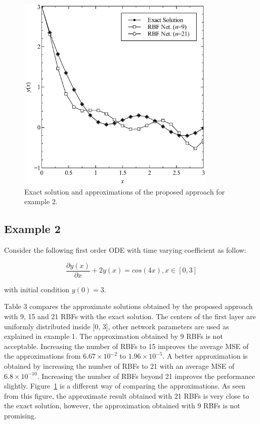 \begin{figure}
\includegraphics[width=9.5cm]{Fig3.eps}
\caption{Exact solution and approximations of the proposed approach for example 2.}
\label{fig3}
\end{figure}

\subsection{Example 2}

Consider the following first order ODE with time varying coefficient as follow:

\begin{equation}
\frac{\partial y(x)}{\partial x}+2y(x)=cos(4x), x \in [0 , 3]
\end{equation}

\noindent
with initial condition $y(0)=3$.

Table 3 compares the approximate solutions obtained by the proposed approach with 9, 15 and 21 RBFs with the exact solution. The centers of the first layer are uniformly distributed inside [0, 3], other network parameters are used as explained in example 1. The approximation obtained by 9 RBFs is not acceptable. Increasing the number of RBFs to 15 improves the average MSE of the approximations from $6.67\times10^{-2}$ to $1.96\times10^{-5}$. A better approximation is obtained by increasing the number of RBFs to 21 with an average MSE of $6.8\times10^{-10}$. Increasing the number of RBFs beyond 21 improves the performance slightly. Figure~\ref{fig3} is a different way of comparing the approximations. As seen from this figure, the approximate result obtained with 21 RBFs is very close to the exact solution, however, the approximation obtained with 9 RBFs is not promising.


